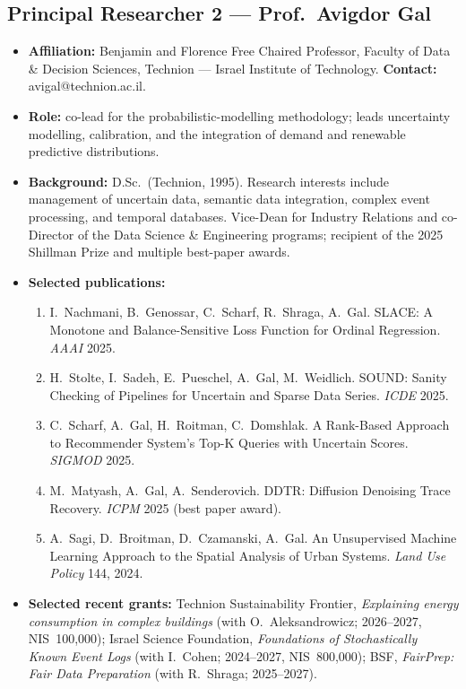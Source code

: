 \documentclass[12pt,a4paper]{article}
\begin{document}
\subsection*{Principal Researcher 2 --- Prof.\ Avigdor Gal}
\begin{itemize}[leftmargin=1.4em]
    \item \textbf{Affiliation:} Benjamin and Florence Free Chaired Professor, Faculty of
          Data \& Decision Sciences, Technion --- Israel Institute of Technology.
          \textbf{Contact:} avigal@technion.ac.il.
    \item \textbf{Role:} co-lead for the probabilistic-modelling methodology; leads
          uncertainty modelling, calibration, and the integration of demand and renewable
          predictive distributions.
    \item \textbf{Background:} D.Sc.\ (Technion, 1995). Research interests include
          management of uncertain data, semantic data integration, complex event
          processing, and temporal databases. Vice-Dean for Industry Relations and
          co-Director of the Data Science \& Engineering programs; recipient of the 2025
          Shillman Prize and multiple best-paper awards.
    \item \textbf{Selected publications:}
    \begin{enumerate}[leftmargin=1.6em,nosep]
        \item I.\ Nachmani, B.\ Genossar, C.\ Scharf, R.\ Shraga, A.\ Gal. SLACE: A
              Monotone and Balance-Sensitive Loss Function for Ordinal Regression.
              \emph{AAAI} 2025.
        \item H.\ Stolte, I.\ Sadeh, E.\ Pueschel, A.\ Gal, M.\ Weidlich. SOUND: Sanity
              Checking of Pipelines for Uncertain and Sparse Data Series. \emph{ICDE} 2025.
        \item C.\ Scharf, A.\ Gal, H.\ Roitman, C.\ Domshlak. A Rank-Based Approach to
              Recommender System's Top-K Queries with Uncertain Scores. \emph{SIGMOD} 2025.
        \item M.\ Matyash, A.\ Gal, A.\ Senderovich. DDTR: Diffusion Denoising Trace
              Recovery. \emph{ICPM} 2025 (best paper award).
        \item A.\ Sagi, D.\ Broitman, D.\ Czamanski, A.\ Gal. An Unsupervised Machine
              Learning Approach to the Spatial Analysis of Urban Systems. \emph{Land Use
              Policy} 144, 2024.
    \end{enumerate}
    \item \textbf{Selected recent grants:} Technion Sustainability Frontier,
          \emph{Explaining energy consumption in complex buildings} (with O.\ Aleksandrowicz;
          2026--2027, NIS~100{,}000); Israel Science Foundation, \emph{Foundations of
          Stochastically Known Event Logs} (with I.\ Cohen; 2024--2027, NIS~800{,}000);
          BSF, \emph{FairPrep: Fair Data Preparation} (with R.\ Shraga; 2025--2027).
\end{itemize}
\end{document}
